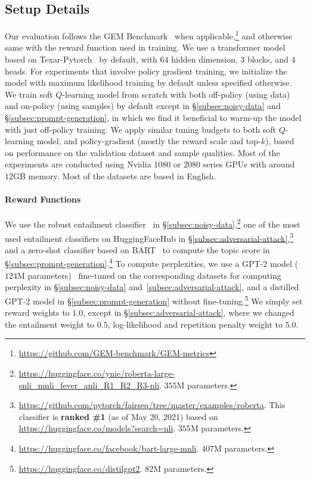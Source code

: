 




\subsection{Setup Details}
\label{appendix-subsec:setup-details}

Our evaluation follows the GEM Benchmark~\citep{gehrmann2021gem} when applicable,\footnote{\url{https://github.com/GEM-benchmark/GEM-metrics}} and otherwise same with the reward function used in training. 
We use a transformer model~\citep{vaswani2017attention} based on Texar-Pytorch~\citep{hu2019texar} by default, with $64$ hidden dimension, $3$ blocks, and $4$ heads. 
For experiments that involve policy gradient training, we initialize the model with maximum likelihood training by default unless specified otherwise. We train soft $Q$-learning model from scratch with both off-policy (using data) and on-policy (using samples) by default except in \S\ref{subsec:noisy-data} and \S\ref{subsec:prompt-generation}, in which we find it beneficial to warm-up the model with just off-policy training. We apply similar tuning budgets to both soft $Q$-learning model, and policy-gradient (mostly the reward scale and top-$k$), based on performance on the validation dataset and sample qualities. Most of the experiments are conducted using Nvidia 1080 or 2080 series GPUs with around $12$GB memory. Most of the datasets are based in English.











\paragraph{Reward Functions}
We use the robust entailment classifier~\citep{nie2020adversarial} in \S\ref{subsec:noisy-data},\footnote{\url{https://huggingface.co/ynie/roberta-large-snli_mnli_fever_anli_R1_R2_R3-nli}. $355$M parameters.} one of the most used entailment classifiers on HuggingFaceHub in \S\ref{subsec:adversarial-attack},\footnote{\url{https://github.com/pytorch/fairseq/tree/master/examples/roberta}. This classifier is \textbf{ranked \#1} (as of May 20, 2021) based on \url{https://huggingface.co/models?search=nli}. $355$M parameters.} and a zero-shot classifier based on BART~\citep{lewis2020bart} to compute the topic score in \S\ref{subsec:prompt-generation}.\footnote{\url{https://huggingface.co/facebook/bart-large-mnli}. $407$M parameters.} To compute perplexities, we use a GPT-2 model ($124$M parameters)~\citep{radford2019language} fine-tuned on the corresponding datasets for computing perplexity in \S\ref{subsec:noisy-data} and~\ref{subsec:adversarial-attack}, and a distilled GPT-2 model in \S\ref{subsec:prompt-generation} without fine-tuning.\footnote{\url{https://huggingface.co/distilgpt2}. $82$M parameters.} We simply set reward weights to $1.0$, except in \S\ref{subsec:adversarial-attack}, where we changed the entailment weight to $0.5$, log-likelihood and repetition penalty weight to $5.0$. 




